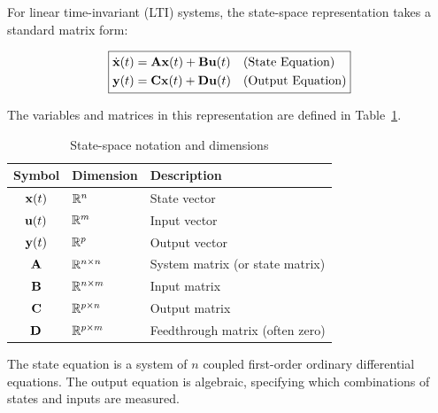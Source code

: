 For linear time-invariant (LTI) systems, the state-space representation takes a standard matrix form:

\begin{equation}
\boxed{
\begin{aligned}
    \dot{\mathbf{x}}(t) &= \mathbf{A}\mathbf{x}(t) + \mathbf{B}\mathbf{u}(t) & &\text{(State Equation)}\\
    \mathbf{y}(t) &= \mathbf{C}\mathbf{x}(t) + \mathbf{D}\mathbf{u}(t) & &\text{(Output Equation)}
\end{aligned}
}
\label{eq:state_space_standard}
\end{equation}

The variables and matrices in this representation are defined in Table~\ref{tab:state_space_notation}.

\begin{table}[htbp]
\centering
\caption{State-space notation and dimensions}
\label{tab:state_space_notation}
\begin{tabular}{cll}
\toprule
\textbf{Symbol} & \textbf{Dimension} & \textbf{Description} \\
\midrule
$\mathbf{x}(t)$ & $\mathbb{R}^n$ & State vector \\
$\mathbf{u}(t)$ & $\mathbb{R}^m$ & Input vector \\
$\mathbf{y}(t)$ & $\mathbb{R}^p$ & Output vector \\
$\mathbf{A}$ & $\mathbb{R}^{n \times n}$ & System matrix (or state matrix) \\
$\mathbf{B}$ & $\mathbb{R}^{n \times m}$ & Input matrix \\
$\mathbf{C}$ & $\mathbb{R}^{p \times n}$ & Output matrix \\
$\mathbf{D}$ & $\mathbb{R}^{p \times m}$ & Feedthrough matrix (often zero) \\
\bottomrule
\end{tabular}
\end{table}

The state equation is a system of $n$ coupled first-order ordinary differential equations. The output equation is algebraic, specifying which combinations of states and inputs are measured.

